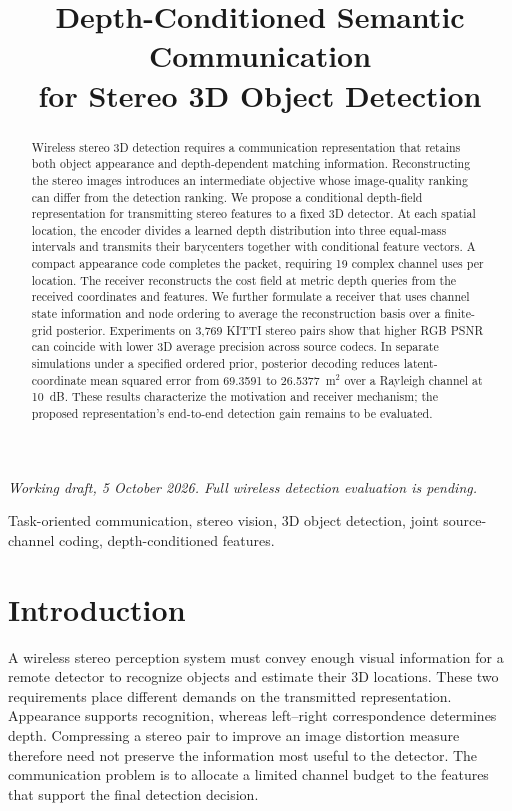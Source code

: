 \documentclass[conference]{IEEEtran}
\title{Depth-Conditioned Semantic Communication\\for Stereo 3D Object Detection}
\author{\IEEEauthorblockN{Authors to be supplied}}
\begin{document}
\maketitle
\begin{center}
\footnotesize\textit{Working draft, 5 October 2026. Full wireless detection evaluation is pending.}
\end{center}

\begin{abstract}
Wireless stereo 3D detection requires a communication representation that
retains both object appearance and depth-dependent matching information.
Reconstructing the stereo images introduces an intermediate objective whose
image-quality ranking can differ from the detection ranking. We propose a
conditional depth-field representation for transmitting stereo features to a
fixed 3D detector. At each spatial location, the encoder divides a learned
depth distribution into three equal-mass intervals and transmits their
barycenters together with conditional feature vectors. A compact appearance
code completes the packet, requiring 19 complex channel uses per location.
The receiver reconstructs the cost field at metric depth queries from the
received coordinates and features. We further formulate a receiver that
uses channel state information and node ordering to average the
reconstruction basis over a finite-grid posterior. Experiments on 3,769
KITTI stereo pairs show that higher RGB PSNR can coincide with lower 3D
average precision across source codecs. In separate simulations under a
specified ordered prior, posterior decoding reduces latent-coordinate mean
squared error from 69.3591 to 26.5377~m$^2$ over a Rayleigh channel at 10~dB.
These results characterize the motivation and receiver mechanism; the
proposed representation's end-to-end detection gain remains to be evaluated.
\end{abstract}

\begin{IEEEkeywords}
Task-oriented communication, stereo vision, 3D object detection,
joint source-channel coding, depth-conditioned features.
\end{IEEEkeywords}

\section{Introduction}
A wireless stereo perception system must convey enough visual information
for a remote detector to recognize objects and estimate their 3D locations.
These two requirements place different demands on the transmitted
representation. Appearance supports recognition, whereas left--right
correspondence determines depth. Compressing a stereo pair to improve an
image distortion measure therefore need not preserve the information most
useful to the detector. The communication problem is to allocate a limited
channel budget to the features that support the final detection decision.
\end{document}

